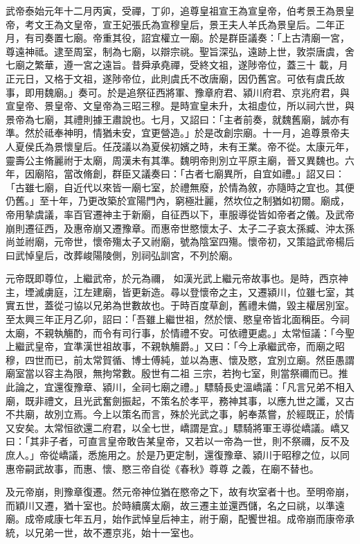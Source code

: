 \begin{pinyinscope}
 武帝泰始元年十二月丙寅，受禪，丁卯，追尊皇祖宣王為宣皇帝，伯考景王為景皇帝，考文王為文皇帝，宣王妃張氏為宣穆皇后，景王夫人羊氏為景皇后。二年正月，有司奏置七廟。帝重其役，詔宜權立一廟。於是群臣議奏：「上古清廟一宮，尊遠神祗。逮至周室，制為七廟，以辯宗祧。聖旨深弘，遠跡上世，敦崇唐虞，舍七廟之繁華，遵一宮之遠旨。昔舜承堯禪，受終文祖，遂陟帝位，蓋三十
 載，月正元日，又格于文祖，遂陟帝位，此則虞氏不改唐廟，因仍舊宮。可依有虞氏故事，即用魏廟。」奏可。於是追祭征西將軍、豫章府君、潁川府君、京兆府君，與宣皇帝、景皇帝、文皇帝為三昭三穆。是時宣皇未升，太祖虛位，所以祠六世，與景帝為七廟，其禮則據王肅說也。七月，又詔曰：「主者前奏，就魏舊廟，誠亦有準。然於祗奉神明，情猶未安，宜更營造。」於是改創宗廟。十一月，追尊景帝夫人夏侯氏為景懷皇后。任茂議以為夏侯初嬪之時，未有王業。帝不從。太康元年，靈壽公主脩麗祔于太廟，周漢未有其準。魏明帝則別立平原主廟，晉又異魏也。六
 年，因廟陷，當改脩創，群臣又議奏曰：「古者七廟異所，自宜如禮。」詔又曰：「古雖七廟，自近代以來皆一廟七室，於禮無廢，於情為敘，亦隨時之宜也。其便仍舊。」至十年，乃更改築於宣陽門內，窮極壯麗，然坎位之制猶如初爾。廟成，帝用摯虞議，率百官遷神主于新廟，自征西以下，車服導從皆如帝者之儀。及武帝崩則遷征西，及惠帝崩又遷豫章。而惠帝世愍懷太子、太子二子哀太孫臧、沖太孫尚並祔廟，元帝世，懷帝殤太子又祔廟，號為陰室四殤。懷帝初，又策謚武帝楊后曰武悼皇后，改葬峻陽陵側，別祠弘訓宮，不列於廟。



 元帝既即尊位，上繼武帝，於元為禰，
 如漢光武上繼元帝故事也。是時，西京神主，堙滅虜庭，江左建廟，皆更新造。尋以登懷帝之主，又遷潁川，位雖七室，其實五世，蓋從刁協以兄弟為世數故也。于時百度草創，舊禮未備，毀主權居別室。至太興三年正月乙卯，詔曰：「吾雖上繼世祖，然於懷、愍皇帝皆北面稱臣。今祠太廟，不親執觴酌，而令有司行事，於情禮不安。可依禮更處。」太常恒議：「今聖上繼武皇帝，宜準漢世祖故事，不親執觴爵。」又曰：「今上承繼武帝，而廟之昭穆，四世而已，前太常賀循、博士傅純，並以為惠、懷及愍，宜別立廟。然臣愚謂廟室當以容主為限，無拘常數。殷世有二祖
 三宗，若拘七室，則當祭禰而已。推此論之，宜還復豫章、潁川，全祠七廟之禮。」驃騎長史溫嶠議：「凡言兄弟不相入廟，既非禮文，且光武奮劍振起，不策名於孝平，務神其事，以應九世之讖，又古不共廟，故別立焉。今上以策名而言，殊於光武之事，躬奉蒸嘗，於經既正，於情又安矣。太常恒欲還二府君，以全七世，嶠謂是宜。」驃騎將軍王導從嶠議。嶠又曰：「其非子者，可直言皇帝敢告某皇帝，又若以一帝為一世，則不祭禰，反不及庶人。」帝從嶠議，悉施用之。於是乃更定制，還復豫章、潁川于昭穆之位，以同惠帝嗣武故事，而惠、懷、愍三帝自從《春秋》尊尊
 之義，在廟不替也。



 及元帝崩，則豫章復遷。然元帝神位猶在愍帝之下，故有坎室者十也。至明帝崩，而穎川又遷，猶十室也。於時續廣太廟，故三遷主並還西儲，名之曰祧，以準遠廟。成帝咸康七年五月，始作武悼皇后神主，祔于廟，配饗世祖。成帝崩而康帝承統，以兄弟一世，故不遷京兆，始十一室也。




\end{pinyinscope}
